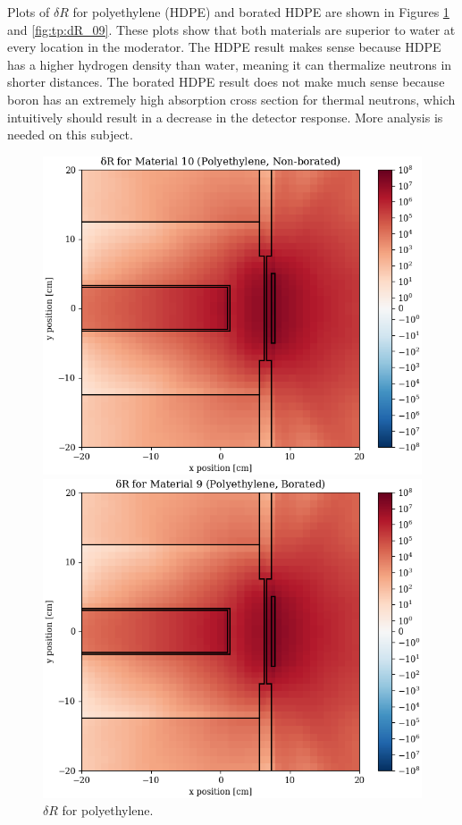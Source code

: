 Plots of $\delta R$ for polyethylene (HDPE) and borated HDPE are shown in Figures \ref{fig:tp:dR_10} and \ref{fig:tp:dR_09}.
These plots show that both materials are superior to water at every location in the moderator.
The HDPE result makes sense because HDPE has a higher hydrogen density than water, meaning it can thermalize neutrons in shorter distances.
The borated HDPE result does not make much sense because boron has an extremely high absorption cross section for thermal neutrons, which intuitively should result in a decrease in the detector response.
More analysis is needed on this subject.

\begin{figure}
  \begin{minipage}{0.49\linewidth}
    \centering
    \includegraphics[width=\linewidth]{content/testprob/dR_10.png}
    \caption{$\delta R$ for polyethylene.}
    \label{fig:tp:dR_10}
  \end{minipage}
  \hfill
  \begin{minipage}{0.49\linewidth}
    \centering
    \includegraphics[width=\linewidth]{content/testprob/dR_09.png}

\end{minipage}
\end{figure}
